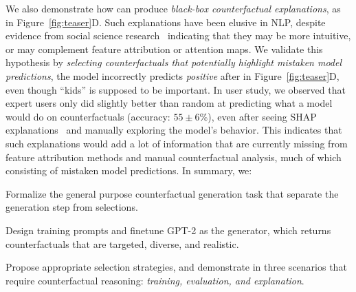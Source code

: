 We also demonstrate how \sysname can produce \emph{black-box counterfactual explanations}, as in Figure~\ref{fig:teaser}D.
Such explanations have been elusive in NLP, despite evidence from social science research~\cite{miller} indicating that they may be more intuitive, or may complement feature attribution or attention maps. 
We validate this hypothesis by \emph{selecting counterfactuals that potentially highlight mistaken model predictions}, \eg the model incorrectly predicts \emph{positive} after  in Figure~\ref{fig:teaser}D, even though ``kids'' is supposed to be important.
In user study, we observed that expert users only did slightly better than random at predicting what a model would do on \sysname counterfactuals (accuracy: $55 \pm 6\%$), even after seeing SHAP explanations~\cite{NIPS2017_7062} and manually exploring the model's behavior. 
This indicates that such explanations would add a lot of information that are currently missing from feature attribution methods and manual counterfactual analysis, much of which consisting of mistaken model predictions.
In summary, we:
\begin{compactenum}
\item  Formalize the general purpose counterfactual generation task that separate the generation step from selections.
\item Design training prompts and finetune GPT-2 as the generator, which returns counterfactuals that are targeted, diverse, and realistic.
\item Propose appropriate selection strategies, and demonstrate \sysname in three scenarios that require counterfactual reasoning: \emph{training, evaluation, and explanation}.
\end{compactenum}


